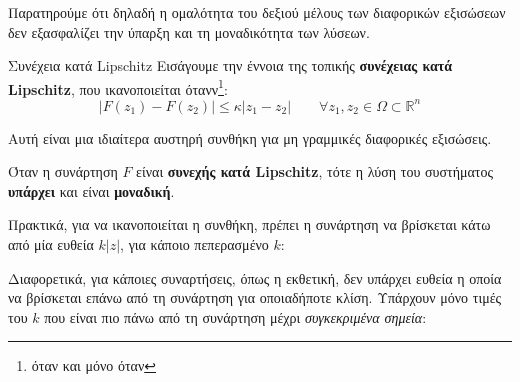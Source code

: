 \documentclass[11pt,a4paper,notitlepage,fleqn]{article}
\begin{document}
Παρατηρούμε ότι δηλαδή η ομαλότητα του δεξιού μέλους των διαφορικών εξισώσεων δεν εξασφαλίζει
την ύπαρξη και τη μοναδικότητα των λύσεων.

\begin{theorem}{Συνέχεια κατά Lipschitz}{}
	Εισάγουμε την έννοια της τοπικής \textbf{συνέχειας κατά Lipschitz}, που ικανοποιείται ότανν\footnote{όταν και μόνο όταν}:
	\[
	\left|
	F(z_1) - F(z_2)
	\right|
	\leq \kappa |z_1-z_2|\qquad \forall z_1,z_2 \in \Omega \subset \mathbb R^n
	\]

	Αυτή είναι μια ιδιαίτερα αυστηρή συνθήκη για μη γραμμικές διαφορικές εξισώσεις.
	\tcblower

	Όταν η συνάρτηση \(  F \) είναι \textbf{συνεχής κατά Lipschitz}, τότε η λύση του συστήματος \textbf{υπάρχει} και
	είναι \textbf{μοναδική}.
\end{theorem}

Πρακτικά, για να ικανοποιείται η συνθήκη, πρέπει η συνάρτηση να βρίσκεται κάτω από μία ευθεία \( k|z| \), για κάποιο
πεπερασμένο \( k \):


Διαφορετικά, για κάποιες συναρτήσεις, όπως η εκθετική, δεν υπάρχει ευθεία η οποία να βρίσκεται
επάνω από τη συνάρτηση για οποιαδήποτε κλίση. Υπάρχουν μόνο τιμές του \( k \) που είναι
πιο πάνω από τη συνάρτηση μέχρι \textit{συγκεκριμένα σημεία}:

\end{document}
